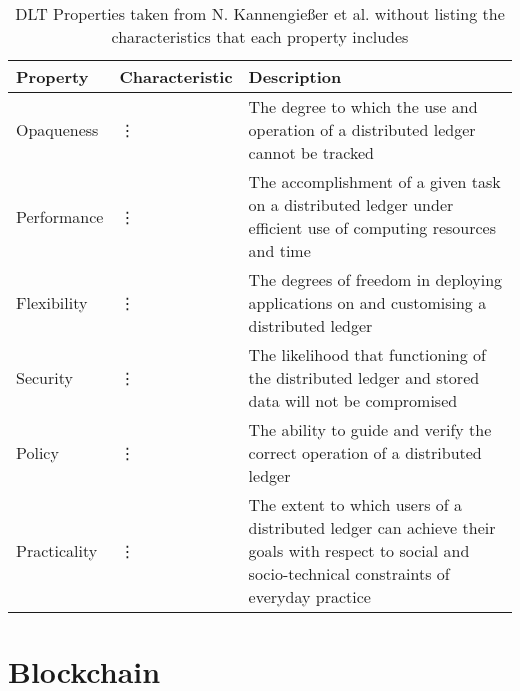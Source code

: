 \begin{table}[H]
    \centering
    \caption{DLT Properties taken from N. Kannengießer et al. \cite{dlt_4} without listing the characteristics that each property includes}
    \label{tab:dltproperties}

\begin{tabular}{|m{2cm}|m{2.7cm}|m{10cm}|}
\hline
\hspace{4pt}\cellcolor{gray!15}\textbf{Property} & \cellcolor{gray!15}\textbf{Characteristic} & \cellcolor{gray!15}\textbf{Description} \\ \hline\hline
{Opaqueness} & \rule{0pt}{3ex}\hspace{39pt}\vdots & The degree to which the use and operation of a distributed ledger cannot be tracked \\ [10pt]\hline\hline
{Performance} & \rule{0pt}{3ex}\hspace{39pt}\vdots & The accomplishment of a given task on a distributed ledger under efficient use of computing resources and time\\ [10pt]\hline\hline
{Flexibility} & \rule{0pt}{3ex}\hspace{39pt}\vdots & The degrees of freedom in deploying applications on and customising a distributed ledger \\ [10pt]\hline\hline
{Security} & \rule{0pt}{3ex}\hspace{39pt}\vdots & The likelihood that functioning of the distributed ledger and stored data will not be compromised\\ [10pt]\hline\hline
{Policy} & \rule{0pt}{3ex}\hspace{39pt}\vdots & The ability to guide and verify the correct operation of a distributed ledger\\ [10pt]\hline\hline
{Practicality} & \rule{0pt}{3ex}\hspace{39pt}\vdots & The extent to which users of a distributed ledger can achieve their goals with respect to social and socio-technical constraints of everyday practice\\ [10pt]\hline
                          
\end{tabular}
\end{table}

\section{Blockchain}
\label{sec:blockchain}

